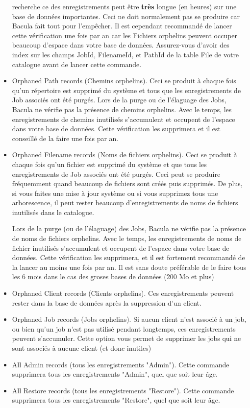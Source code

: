 \begin{itemize}
    recherche ce des enregistrements peut être {\bf très} longue (en heures) sur
    une base de données importantes. Ceci ne doit normalement pas se produire 
    car Bacula fait tout pour l'empêcher. Il est cependant recommandé de lancer
    cette vérification une fois par an car les Fichiers orphelins peuvent
    occuper beaucoup d'espace dans votre base de données. Assurez-vous d'avoir
    des index sur les champs JobId, FilenameId, et PathId de la table File de
    votre catalogue avant de lancer cette commande.
\item Orphaned Path records (Chemins orphelins). Ceci se produit à chaque fois
    qu'un répertoire est supprimé du système et tous que les enregistrements de 
    Job associés ont été purgés. Lors de la purge ou de l'élaguage des Jobs, 
    Bacula ne vérifie pas la présence de chemins orphelins. Avec le temps, les 
    enregistrements de chemins inutilisés s'accumulent et occupent de l'espace
    dans votre base de données. Cette vérification les supprimera et il est 
    conseillé de la faire une fois par an.
\item Orphaned Filename records (Noms de fichiers orphelins). Ceci se produit
    à chaque fois qu'un fichier est supprimé du système et que tous les 
    enregistrements de Job associés ont été purgés. Ceci peut se produire
    fréquemment quand beaucoup de fichiers sont créés puis supprimés. De plus, 
    si vous faites une mise à jour système ou si vous supprimez tous une
    arborescence, il peut rester beaucoup d'enregistrements de noms de fichiers
    inutilisés dans le catalogue.  

    Lors de la purge (ou de l'élaguage) des Jobs, Bacula ne vérifie pas la 
    présence de noms de fichiers orphelins. Avec le temps, les enregistrements
    de noms de fichier inutilisés s'accumulent et occupent de l'espace dans
    votre base de données. Cette vérification les supprimera, et il est
    fortement recommandé de la lancer au moins une fois par an. Il est sans 
    doute préférable de le faire tous les 6 mois dans le cas des groses bases
    de données (200 Mo et plus)
\item Orphaned Client records (Clients orphelins). Ces enregistrements peuvent
    rester dans la base de données après la suppression d'un client.
\item Orphaned Job records (Jobs orphelins). Si aucun client n'est associé à un
    job, ou bien qu'un job n'est pas utilisé pendant longtemps, ces 
    enregistrements peuvent s'accumuler. Cette option vous permet de supprimer
    les jobs qui ne sont associés à aucune client (et donc inutiles)
\item All Admin records (tous les enregistrements "Admin"). Cette commande 
    supprimera tous les enregistrements "Admin", quel que soit leur âge.
\item All Restore records (tous les enregistrements "Restore"). Cette commande 
    supprimera tous les enregistrements "Restore", quel que soit leur âge.
\end{itemize}


